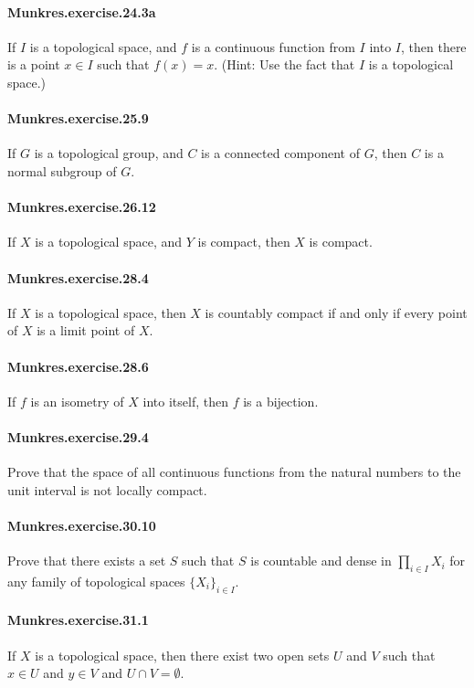 \documentclass{article}
\begin{document}
\paragraph{Munkres.exercise.24.3a} If $I$ is a topological space, and $f$ is a continuous function from $I$ into $I$, then there is a point $x \in I$ such that $f(x) = x$. (Hint: Use the fact that $I$ is a topological space.)

\paragraph{Munkres.exercise.25.9} If $G$ is a topological group, and $C$ is a connected component of $G$, then $C$ is a normal subgroup of $G$.

\paragraph{Munkres.exercise.26.12} If $X$ is a topological space, and $Y$ is compact, then $X$ is compact.

\paragraph{Munkres.exercise.28.4} If $X$ is a topological space, then $X$ is countably compact if and only if every point of $X$ is a limit point of $X$.

\paragraph{Munkres.exercise.28.6} If $f$ is an isometry of $X$ into itself, then $f$ is a bijection.

\paragraph{Munkres.exercise.29.4} Prove that the space of all continuous functions from the natural numbers to the unit interval is not locally compact.

\paragraph{Munkres.exercise.30.10} Prove that there exists a set $S$ such that $S$ is countable and dense in $\prod_{i\in I}X_i$ for any family of topological spaces $\{X_i\}_{i\in I}$.

\paragraph{Munkres.exercise.31.1} If $X$ is a topological space, then there exist two open sets $U$ and $V$ such that $x \in U$ and $y \in V$ and $U \cap V = \emptyset$. 
\end{document}
